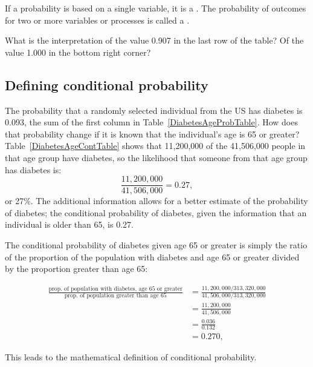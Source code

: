 \begin{doublespace}
\begin{termBox}{
If a probability is based on a single variable, it is a \emph{}. The probability of outcomes for two or more variables or processes is called a \emph{}.}
\end{termBox}

\begin{exercise} 
  {What is the interpretation of the value 0.907 in the last row of the table?  Of the value 1.000 in the bottom right corner? }
\label{MarginalJointProbDiabetes}
\end{exercise}


\subsection{Defining conditional probability}


The probability that a randomly selected individual from the US has diabetes is 0.093, the sum of the first column in Table~\ref{DiabetesAgeProbTable}.  How does that probability change if it is known that the individual's age is 65 or greater?  Table~\ref{DiabetesAgeContTable} shows that 11,200,000 of the 41,506,000 people in that age group have diabetes, so the likelihood that someone from that age group has diabetes is:
\[  
     \frac{11,200,000}{41,506,000} = 0.27,
\]
or 27\%.  The additional information allows for a better estimate of the probability of diabetes; the conditional probability of diabetes, given the information that an individual is older than 65, is 0.27.

The conditional probability of diabetes given age 65 or greater is simply the ratio of the proportion of the population with diabetes and age 65 or greater divided by the proportion greater than age 65:
 
\begin{align*}
    \frac{\text{prop. of population with diabetes, age 65 or greater}}{\text{prop. of population greater than age 65}} &= \frac{11,200,000/313,320,000}{41,506,000/313,320,000}\\
			&=\frac{11,200,000}{41,506,000} \\
	                               &= \frac{0.036}{0.132} \\
								   &= 0.270,
\end{align*}

This leads to the mathematical definition of conditional probability.


\end{doublespace}
